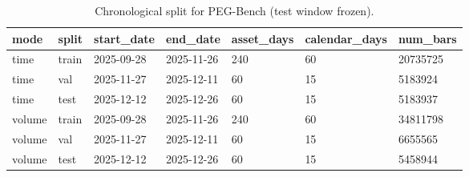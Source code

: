\begin{table}[t]
\centering
\caption{Chronological split for PEG-Bench (test window frozen).}
\label{tab:table_09_split}
\begin{tabular}{lllllll}
\toprule
mode & split & start\_date & end\_date & asset\_days & calendar\_days & num\_bars \\
\midrule
time & train & 2025-09-28 & 2025-11-26 & 240 & 60 & 20735725 \\
time & val & 2025-11-27 & 2025-12-11 & 60 & 15 & 5183924 \\
time & test & 2025-12-12 & 2025-12-26 & 60 & 15 & 5183937 \\
volume & train & 2025-09-28 & 2025-11-26 & 240 & 60 & 34811798 \\
volume & val & 2025-11-27 & 2025-12-11 & 60 & 15 & 6655565 \\
volume & test & 2025-12-12 & 2025-12-26 & 60 & 15 & 5458944 \\
\bottomrule
\end{tabular}
\end{table}
